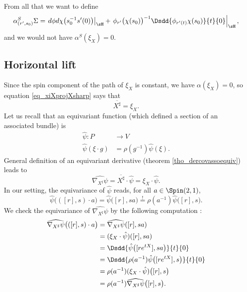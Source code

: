 From all that we want to define
\begin{equation}
   \alpha^{S}_{(r',s_{0})}\Sigma=\left.d\phi d\chi\big(s_{0}^{-1}s'(0)\big)\right|_{\sH}+\left.\phi_{r'}\big( \chi(s_{0}) \big)^{-1}\Dsdd{ \phi_{r'(t)}\chi(s_{0}) }{t}{0}\right|_{\sH},
\end{equation}
and we would not have $\alpha^{S}(\xi_{X})=0$.


\subsection{Horizontal lift}

Since the spin component of the path of $\xi_{X}$ is constant, we have $\alpha(\xi_{X})=0$, so equation  \eqref{eq_xiXprojXsharp} says that
\begin{equation}
\overline{ X^{\sharp} }=\xi_{X}.
\end{equation}
Let us recall that an equivariant function (which defined a section of an associated bundle) is
\begin{equation}
\begin{aligned}
 \hat{\psi}\colon P&\to V \\ 
\hat{\psi}(\xi\cdot g)&= \rho(g^{-1})\hat{\psi}(\xi). 
\end{aligned}
\end{equation}
General definition of an equivariant derivative (theorem \ref{tho_dercovassoequiv}) leads to
\[ 
  \widehat{    \nabla_{X^{\sharp}}\psi    }=\overline{ X^{\sharp} }\cdot\hat{\psi}=\xi_{X} \cdot \hat{\psi}.
\]
In our setting, the equivariance of $\hat{\psi}$ reads, for all $a\in\Spin(2,1)$, 
\[ 
  \hat{\psi}\big( ([r],s)\cdot a \big)=\hat{\psi}\big( [r],sa \big)\stackrel{!}{=}\rho(a^{-1})\hat{\psi}\big( [r],s \big).
\]
We check the equivariance of $\widehat{\nabla_{X^{\sharp}}\psi}$ by the following computation :
\[ 
\begin{split}
\widehat{\nabla_{X^{\sharp}}\psi  }\big( ([r],s)\cdot a \big)&=\widehat{\nabla_{X^{\sharp}}\psi}( [r],sa )\\
        &=(\xi_{X}\cdot \hat{\psi})([r],sa)\\
        &=\Dsdd{ \hat{\psi}\big( [r e^{tX}],sa \big) }{t}{0}\\
        &=\Dsdd{ \rho(a^{-1})\hat{\psi}\big( [r e^{tX}],s \big) }{t}{0}\\
        &=\rho(a^{-1})(\xi_{X}\cdot \hat{\psi})\big( [r],s \big)\\
        &=\rho(a^{-1})\widehat{  \nabla_{X^{\sharp}}\psi  }\big( [r],s \big).
\end{split}  
\]

